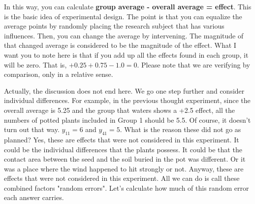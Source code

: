 \documentclass{ltjbook}
\begin{document}
In this way, you can calculate \textbf{group average - overall average = effect}. This is the basic idea of experimental design. The point is that you can equalize the average points by randomly placing the research subject that has various influences. Then, you can change the average by intervening. The magnitude of that changed average is considered to be the magnitude of the effect. What I want you to note here is that if you add up all the effects found in each group, it will be zero. That is, $+0.25+0.75-1.0=0$. Please note that we are verifying by comparison, only in a relative sense.

Actually, the discussion does not end here. We go one step further and consider individual differences. For example, in the previous thought experiment, since the overall average is 5.25 and the group that waters shows a +2.5 effect, all the numbers of potted plants included in Group 1 should be 5.5. Of course, it doesn't turn out that way. $y_{11} = 6$ and $y_{41} = 5$. What is the reason these did not go as planned? Yes, these are effects that were not considered in this experiment. It could be the individual differences that the plants possess. It could be that the contact area between the seed and the soil buried in the pot was different. Or it was a place where the wind happened to hit strongly or not. Anyway, these are effects that were not considered in this experiment. All we can do is call these combined factors "random errors". Let's calculate how much of this random error each answer carries.
\end{document}
